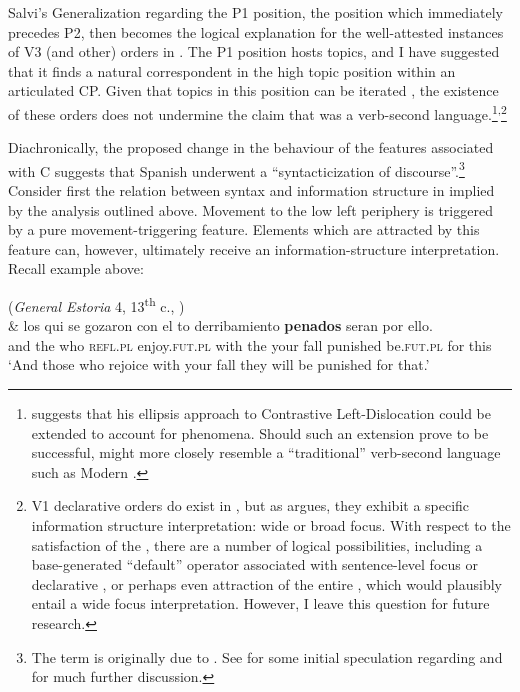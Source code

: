 \documentclass[output=paper]{LSP/langsci}
\begin{document}
Salvi’s Generalization regarding the P1 position, the position which immediately precedes P2, then becomes the logical explanation for the well-attested instances of V3 (and other) orders in .  The P1 position hosts topics, and I have suggested that it finds a natural correspondent in the high topic position within an articulated CP.  Given that topics in this position can be iterated \citep[103]{Salvi2012}, the existence of these orders does not undermine the claim that  was a verb-second language.\footnote{\citet[Fn~34]{Ott2014} suggests that his ellipsis approach to Contrastive Left-Dislocation could be extended to account for   phenomena.  Should such an extension prove to be successful,  might more closely resemble a ``traditional'' verb-second language such as Modern .}\textsuperscript{,}\footnote{V1 declarative orders do exist in , but as \citet{Poole2016} argues, they exhibit a specific information structure interpretation: wide or broad focus.  With respect to the satisfaction of the , there are a number of logical possibilities, including a base-generated ``default'' operator associated with sentence-level focus or declarative , or perhaps even attraction of the entire , which would plausibly entail a wide focus interpretation.  However, I leave this {question} for future research.}

Diachronically, the proposed change in the behaviour of the features associated with C suggests that Spanish underwent a ``syntacticization of discourse''.\footnote{The term is originally due to \citet{HaegemanHill2013}.  See \citet[160]{Sitaridou2011} for some initial speculation regarding  and \citet{Poole2016} for much further discussion.}   Consider first the relation between syntax and information structure in  implied by the analysis outlined above.  Movement to the low left periphery is triggered by a pure movement-triggering feature.  Elements which are attracted by this feature can, however, ultimately receive an information-structure interpretation.  Recall example  above:

\begin{exe}
    (\textit{General Estoria} 4, 13\textsuperscript{th} c., \citealt[(25)]{Sitaridou2011})\\
    \gll  \& los qui se  gozaron con el to derribamiento \textbf{penados} seran por ello.\\
	  and the who \textsc{refl.pl} enjoy.\textsc{fut}.\textsc{pl} with the your fall punished be.\textsc{fut}.\textsc{pl} for this\\
    \glt  ‘And those who rejoice with your fall they will be punished for that.’
\end{exe}
\end{document}
